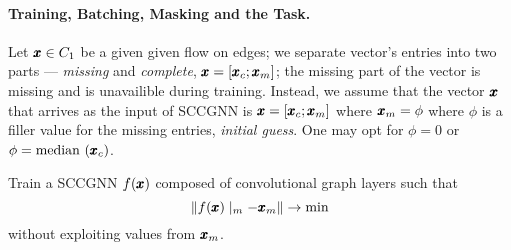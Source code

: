 \documentclass{mynotes}
\begin{document}
\paragraph{ Training, Batching, Masking and the Task. }

Let \( \pmb{x} \in C_1 \) be a given given flow on edges; we separate vector's entries into two parts --- \emph{missing} and \emph{complete}, \( \pmb{x} = [ \pmb{x}_c; \pmb{x}_m  ] \); the missing part of the vector is missing and is unavailible during training. Instead, we assume that the vector \( \pmb{x} \) that arrives as the input of SCCGNN is \( \pmb{x} = [\pmb{x}_c; \pmb{x}_m ]\) where \( \pmb{x}_m = \phi \) where \( \phi \) is a filler value for the missing entries, \emph{initial guess}. One may opt for  \( \phi = 0 \) or \( \phi = \mathrm{median}\, \left(  \pmb{x}_c \right) \).

\begin{problem}
      Train a SCCGNN \( f(\pmb{x})\) composed of convolutional graph layers such that 
      \begin{equation}
            \left\| f(\pmb{x}) \mid_m - \pmb{x}_m  \right\| \to \min
      \end{equation}
      without exploiting values from \( \pmb{x}_m \).
\end{problem}
\end{document}
